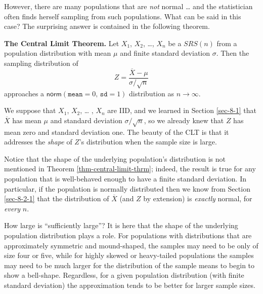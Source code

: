 \documentclass[captions=tableheading]{scrbook}
\begin{document}
However, there are many populations that are \emph{not} normal \ldots{} and the statistician often finds herself sampling from such populations. What can be said in this case? The surprising answer is contained in the following theorem.

\begin{thm}
\textbf{The Central Limit Theorem.} Let \(X_{1}\), \(X_{2}\), \ldots{}, \(X_{n}\) be a \(SRS(n)\) from a population distribution with mean \(\mu\) and finite standard deviation \(\sigma\). Then the sampling distribution of 
\begin{equation}
Z=\frac{\overline{X}-\mu}{\sigma/\sqrt{n}}
\end{equation}
approaches a \(\mathsf{norm}(\mathtt{mean}=0,\,\mathtt{sd}=1)\) distribution as \(n\to\infty\).
\end{thm}

\begin{rem}
We suppose that \(X_{1}\), \(X_{2}\), \ldots{} , \(X_{n}\) are IID, and we learned in Section \ref{sec-8-1} that \(\overline{X}\) has mean \(\mu\) and standard deviation \(\sigma/\sqrt{n}\), so we already knew that \(Z\) has mean zero and standard deviation one. The beauty of the CLT is that it addresses the \emph{shape} of \(Z\)'s distribution when the sample size is large.
\end{rem}

\begin{rem}
Notice that the shape of the underlying population's distribution is not mentioned in Theorem \ref{thm-central-limit-thrm}; indeed, the result is true for any population that is well-behaved enough to have a finite standard deviation. In particular, if the population is normally distributed then we know from Section \ref{sec-8-2-1} that the distribution of \(\overline{X}\) (and \(Z\) by extension) is \emph{exactly} normal, for \emph{every} \(n\).
\end{rem}

\begin{rem}
How large is ``sufficiently large''? It is here that the shape of the underlying population distribution plays a role. For populations with distributions that are approximately symmetric and mound-shaped, the samples may need to be only of size four or five, while for highly skewed or heavy-tailed populations the samples may need to be much larger for the distribution of the sample means to begin to show a bell-shape. Regardless, for a given population distribution (with finite standard deviation) the approximation tends to be better for larger sample sizes.
\end{rem}
\end{document}
